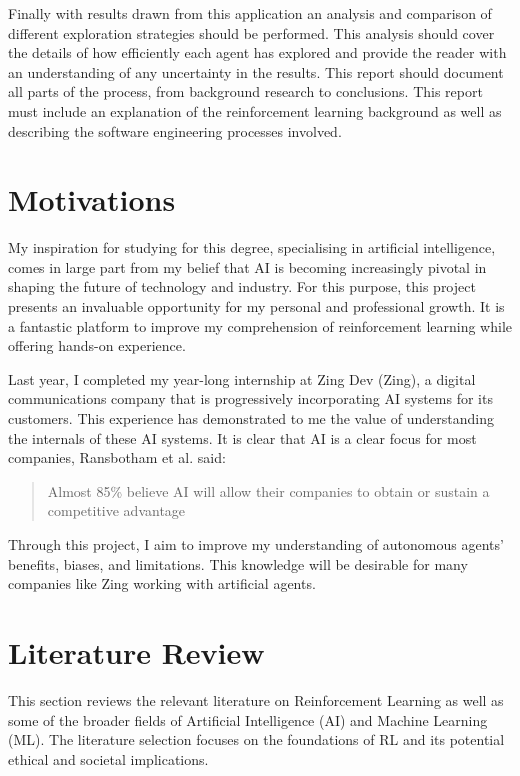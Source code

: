 \documentclass[]{final_report}
\begin{document}
Finally with results drawn from this application an analysis and comparison of different exploration strategies should be performed. This analysis should cover the details of how efficiently each agent has explored and provide the reader with an understanding of any uncertainty in the results. This report should document all parts of the process, from background research to conclusions. This report must include an explanation of the reinforcement learning background as well as describing the software engineering processes involved.

\newpage
\section{Motivations}

My inspiration for studying for this degree, specialising in artificial intelligence, comes in large part from my belief that AI is becoming increasingly pivotal in shaping the future of technology and industry. For this purpose, this project presents an invaluable opportunity for my personal and professional growth. It is a fantastic platform to improve my comprehension of reinforcement learning while offering hands-on experience. 

Last year, I completed my year-long internship at Zing Dev (Zing), a digital communications company that is progressively incorporating AI systems for its customers. This experience has demonstrated to me the value of understanding the internals of these AI systems. It is clear that AI is a clear focus for most companies, Ransbotham et al. said: 
\begin{quote}
  Almost 85\% believe AI will allow their companies to obtain or sustain a competitive advantage~\cite{ransbotham2017reshaping}
\end{quote}

Through this project, I aim to improve my understanding of autonomous agents' benefits, biases, and limitations. This knowledge will be desirable for many companies like Zing working with artificial agents.


\section{Literature Review}\label{sect:literature-review}

This section reviews the relevant literature on Reinforcement Learning as well as some of the broader fields of Artificial Intelligence (AI) and Machine Learning (ML). The literature selection focuses on the foundations of RL and its potential ethical and societal implications.
\end{document}
